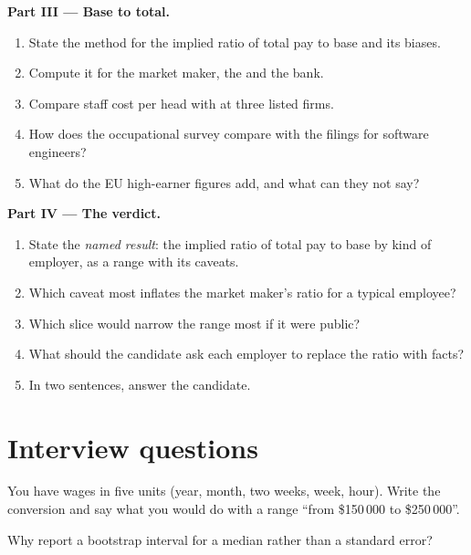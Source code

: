 \begin{problem}
\medskip\noindent\textbf{Part III --- Base to total.}
\begin{enumerate}[resume]
\item State the method for the implied ratio of total pay to base and its biases.
\item Compute it for the market maker, the  and the bank.
\item Compare staff cost per head with  at three listed firms.
\item How does the occupational survey compare with the filings for software engineers?
\item What do the EU high-earner figures add, and what can they not say?
\end{enumerate}

\medskip\noindent\textbf{Part IV --- The verdict.}
\begin{enumerate}[resume]
\item State the \emph{named result}: the implied ratio of total pay to base by kind of employer, as a range with its caveats.
\item Which caveat most inflates the market maker's ratio for a typical employee?
\item Which slice would narrow the range most if it were public?
\item What should the candidate ask each employer to replace the ratio with facts?
\item In two sentences, answer the candidate.
\end{enumerate}
\end{problem}

\section{Interview questions}

\begin{interviewq}\label{iq:in:pay-levels-by-role-firm-type-and-seniority:1}
You have wages in five units (year, month, two weeks, week, hour). Write the conversion and say what you would do with a
range ``from \$150\,000 to \$250\,000''.
\end{interviewq}

\begin{interviewq}\label{iq:in:pay-levels-by-role-firm-type-and-seniority:2}
Why report a bootstrap interval for a median rather than a standard error?
\end{interviewq}

